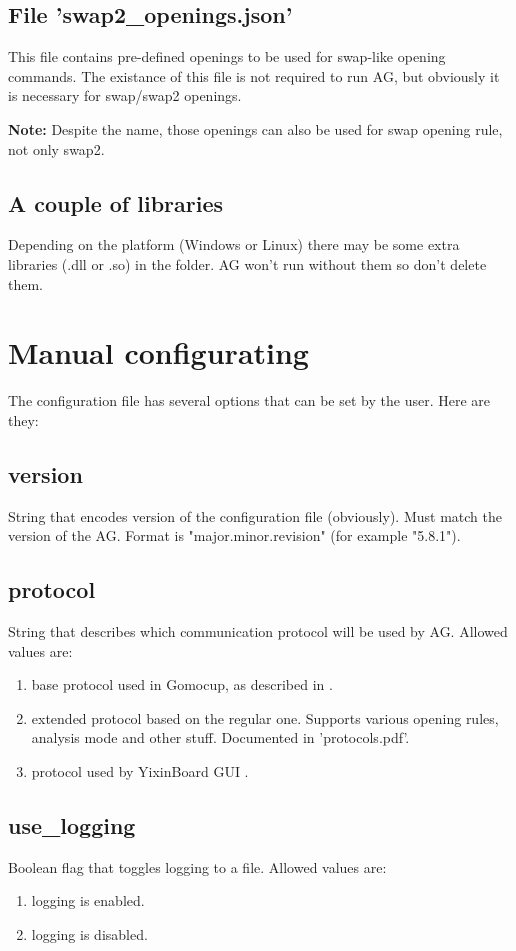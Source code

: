 \documentclass[12pt,a4paper]{article}
\begin{document}
\subsection{File 'swap2{\_}openings.json'}
This file contains pre-defined openings to be used for swap-like opening commands. The existance of this file is not required to run AG, but obviously it is necessary for swap/swap2 openings.

\textbf{Note:} Despite the name, those openings can also be used for swap opening rule, not only swap2.

\subsection{A couple of libraries}
Depending on the platform (Windows or Linux) there may be some extra libraries (.dll or .so) in the folder. AG won't run without them so don't delete them.


\newpage
\section{Manual configurating}
The configuration file has several options that can be set by the user. Here are they:

\subsection{version}
String that encodes version of the configuration file (obviously). Must match the version of the AG. Format is "major.minor.revision" (for example "5.8.1").

\subsection{protocol}
String that describes which communication protocol will be used by AG. Allowed values are:
\begin{enumerate}[leftmargin=7.5em]
	\item[\text{"gomocup"}]{base protocol used in Gomocup, as described in \cite{newprotocol}.}
	\item[\text{"extended{\_}gomocup"}]{extended protocol based on the regular one. Supports various opening rules, analysis mode and other stuff. Documented in 'protocols.pdf'.}
	\item[\text{"yixinboard"}]{protocol used by YixinBoard GUI \cite{yixinboard}.}
\end{enumerate}

\subsection{use{\_}logging}
Boolean flag that toggles logging to a file. Allowed values are:
\begin{enumerate}[leftmargin=7.5em]
	\item[\text{"true"}]{logging is enabled.}
	\item[\text{"false"}]{logging is disabled.}
\end{enumerate}
\end{document}

